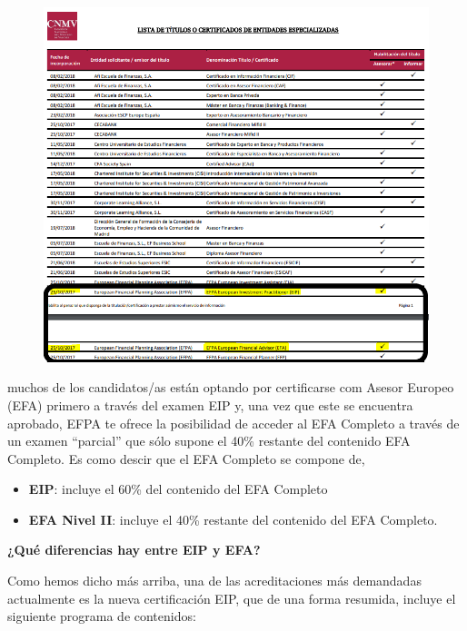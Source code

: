 \documentclass[
  letterpaper,
  DIV=11,
  numbers=noendperiod]{scrreprt}
\begin{document}
\begin{figure}

{\centering \includegraphics[width=1\textwidth,height=\textheight]{./images/lista_titulos.png}

}

\end{figure}

muchos de los candidatos/as están optando por certificarse com Asesor
Europeo (EFA) primero a través del examen EIP y, una vez que este se
encuentra aprobado, EFPA te ofrece la posibilidad de acceder al EFA
Completo a través de un examen ``parcial'' que sólo supone el 40\%
restante del contenido EFA Completo. Es como descir que el EFA Completo
se compone de,

\begin{itemize}
\item
  \textbf{EIP}: incluye el 60\% del contenido del EFA Completo
\item
  \textbf{EFA Nivel II}: incluye el 40\% restante del contenido del EFA
  Completo.
\end{itemize}

\textbf{¿Qué diferencias hay entre EIP y EFA?}

Como hemos dicho más arriba, una de las acreditaciones más demandadas
actualmente es la nueva certificación EIP, que de una forma resumida,
incluye el siguiente programa de contenidos:
\end{document}
